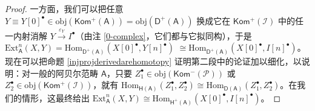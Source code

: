 \begin{proof}
	一方面，我们可以把任意 $Y\equiv Y[0]^\bullet\in\text{obj}(\mathsf{Kom^+(A)})=\text{obj}(\mathsf{D^+(A)})$ 换成它在 $\mathsf{Kom^+(\mathcal{I})}$ 中的任一内射消解 $Y\xrightarrow{\varepsilon_Y}I^\bullet$（由注 \ref{0-complex}，它们都与它拟同构），于是 $\text{Ext}_\mathsf{A}^n(X,Y)=\text{Hom}_\mathsf{D^+(A)}(X[0]^\bullet,Y[n]^\bullet)$ $\cong\text{Hom}_\mathsf{D^+(A)}(X[0]^\bullet,I[n]^\bullet)$。现在可以把命题 \ref{injprojderivedarehomotopy} 证明第二段中的论证加以细化，以说明：对一般的阿贝尔范畴 $\mathsf{A}$，只要 $Z_1^\bullet\in\text{obj}(\mathsf{Kom^-(\mathcal{P})})$ 或 $Z_2^\bullet\in\text{obj}(\mathsf{Kom^+(\mathcal{I})})$，就有 $\text{Hom}_\mathsf{H(A)}(Z_1^\bullet,Z_2^\bullet)\cong\text{Hom}_\mathsf{D(A)}(Z_1^\bullet,Z_2^\bullet)$。在我们的情形，这最终给出 $\text{Ext}_\mathsf{A}^n(X,Y)\cong\text{Hom}_\mathsf{H^+(A)}(X[0]^\bullet,I[n]^\bullet)$。
	

\end{proof}
